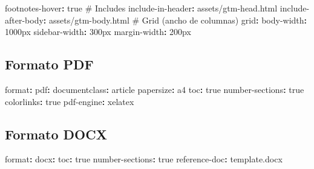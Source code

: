 \documentclass[
  doc,
  floatsintext,
  longtable,
  a4paper,
  nolmodern,
  notxfonts,
  notimes,
  12pt,
  colorlinks=true,linkcolor=blue,citecolor=blue,urlcolor=blue]{apa7}
\newenvironment{Shaded}{\begin{snugshade}}{\end{snugshade}}
\newcommand{\AttributeTok}[1]{\textcolor[rgb]{0.40,0.45,0.13}{#1}}
\newcommand{\CharTok}[1]{\textcolor[rgb]{0.13,0.47,0.30}{#1}}
\newcommand{\CommentTok}[1]{\textcolor[rgb]{0.37,0.37,0.37}{#1}}
\newcommand{\FunctionTok}[1]{\textcolor[rgb]{0.28,0.35,0.67}{#1}}
\newcommand{\KeywordTok}[1]{\textcolor[rgb]{0.00,0.23,0.31}{\textbf{#1}}}
\begin{document}
\begin{Shaded}
\begin{Highlighting}[]
\AttributeTok{    }\FunctionTok{footnotes{-}hover}\KeywordTok{:}\AttributeTok{ }\CharTok{true}
\AttributeTok{    }
\CommentTok{    \# Includes}
\AttributeTok{    }\FunctionTok{include{-}in{-}header}\KeywordTok{:}\AttributeTok{ assets/gtm{-}head.html}
\AttributeTok{    }\FunctionTok{include{-}after{-}body}\KeywordTok{:}\AttributeTok{ assets/gtm{-}body.html}
\AttributeTok{    }
\CommentTok{    \# Grid (ancho de columnas)}
\AttributeTok{    }\FunctionTok{grid}\KeywordTok{:}
\AttributeTok{      }\FunctionTok{body{-}width}\KeywordTok{:}\AttributeTok{ 1000px}
\AttributeTok{      }\FunctionTok{sidebar{-}width}\KeywordTok{:}\AttributeTok{ 300px}
\AttributeTok{      }\FunctionTok{margin{-}width}\KeywordTok{:}\AttributeTok{ 200px}
\end{Highlighting}
\end{Shaded}

\subsection{Formato PDF}\label{formato-pdf}

\begin{Shaded}
\begin{Highlighting}[]
\FunctionTok{format}\KeywordTok{:}
\AttributeTok{  }\FunctionTok{pdf}\KeywordTok{:}
\AttributeTok{    }\FunctionTok{documentclass}\KeywordTok{:}\AttributeTok{ article}
\AttributeTok{    }\FunctionTok{papersize}\KeywordTok{:}\AttributeTok{ a4}
\AttributeTok{    }\FunctionTok{toc}\KeywordTok{:}\AttributeTok{ }\CharTok{true}
\AttributeTok{    }\FunctionTok{number{-}sections}\KeywordTok{:}\AttributeTok{ }\CharTok{true}
\AttributeTok{    }\FunctionTok{colorlinks}\KeywordTok{:}\AttributeTok{ }\CharTok{true}
\AttributeTok{    }\FunctionTok{pdf{-}engine}\KeywordTok{:}\AttributeTok{ xelatex}
\end{Highlighting}
\end{Shaded}

\subsection{Formato DOCX}\label{formato-docx}

\begin{Shaded}
\begin{Highlighting}[]
\FunctionTok{format}\KeywordTok{:}
\AttributeTok{  }\FunctionTok{docx}\KeywordTok{:}
\AttributeTok{    }\FunctionTok{toc}\KeywordTok{:}\AttributeTok{ }\CharTok{true}
\AttributeTok{    }\FunctionTok{number{-}sections}\KeywordTok{:}\AttributeTok{ }\CharTok{true}
\AttributeTok{    }\FunctionTok{reference{-}doc}\KeywordTok{:}\AttributeTok{ template.docx}
\end{Highlighting}
\end{Shaded}
\end{document}
